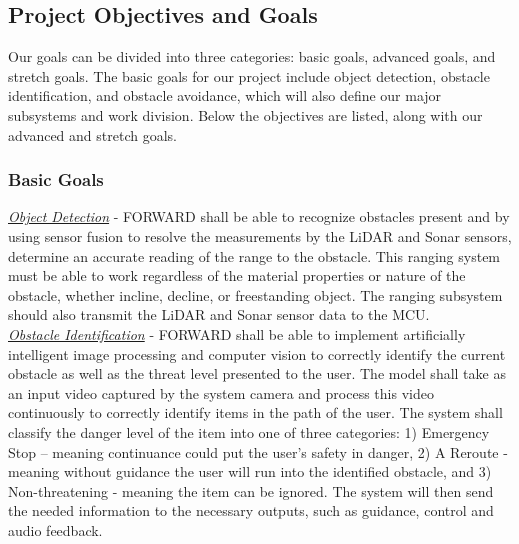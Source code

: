 \subsection{Project Objectives and Goals}
\noindent Our goals can be divided into three categories: basic goals, advanced goals, and stretch goals. The basic goals for our project include object detection, obstacle identification, and obstacle avoidance, which will also define our major subsystems and work division. Below the objectives are listed, along with our advanced and stretch goals.

\subsubsection{Basic Goals}
\noindent \underline{\textit{Object Detection}} - FORWARD shall be able to recognize obstacles present and by using sensor fusion to resolve the measurements by the LiDAR and Sonar sensors, determine an accurate reading of the range to the obstacle. This ranging system must be able to work regardless of the material properties or nature of the obstacle, whether incline, decline, or freestanding object. The ranging subsystem should also transmit the LiDAR and Sonar sensor data to the MCU. \\

\noindent \underline{\textit{Obstacle Identification}} - FORWARD shall be able to implement artificially intelligent image processing and computer vision to correctly identify the current obstacle as well as the threat level presented to the user. The model shall take as an input video captured by the system camera and process this video continuously to correctly identify items in the path of the user. The system shall classify the danger level of the item into one of three categories: 1) Emergency Stop – meaning continuance could put the user’s safety in danger, 2) A Reroute - meaning without guidance the user will run into the identified obstacle, and 3) Non-threatening - meaning the item can be ignored. The system will then send the needed information to the necessary outputs, such as guidance, control and audio feedback. \\

